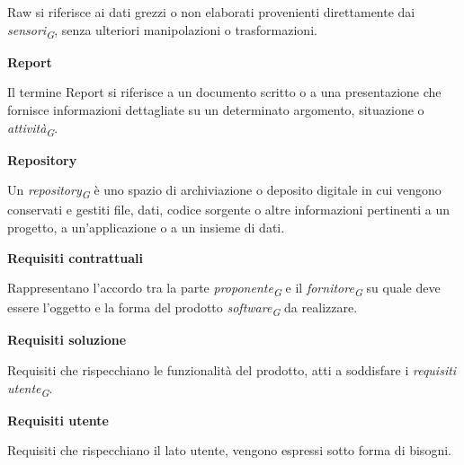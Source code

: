 \documentclass{article}
\begin{document}
\vspace{0.1cm}

Raw si riferisce ai dati grezzi o non elaborati provenienti direttamente dai \textit{sensori}\textsubscript{\textit{G}}, senza ulteriori manipolazioni o trasformazioni.

\vspace{0.4cm}

\textbf{Report}

\vspace{0.1cm}

Il termine Report si riferisce a un documento scritto o a una presentazione che fornisce informazioni dettagliate su un determinato argomento, situazione o \textit{attività}\textsubscript{\textit{G}}.

\vspace{0.4cm}

\textbf{Repository}

\vspace{0.1cm}

Un \textit{repository}\textsubscript{\textit{G}} è uno spazio di archiviazione o deposito digitale in cui vengono conservati e gestiti file, dati, codice sorgente o altre informazioni pertinenti a un progetto, a un'applicazione o a un insieme di dati.

\vspace{0.4cm}

\textbf{Requisiti contrattuali}

\vspace{0.1cm}

Rappresentano l’accordo tra la parte \textit{proponente}\textsubscript{\textit{G}} e il \textit{fornitore}\textsubscript{\textit{G}} su quale deve essere l’oggetto e la forma del prodotto \textit{software}\textsubscript{\textit{G}} da realizzare.

\vspace{0.4cm}

\textbf{Requisiti soluzione}

\vspace{0.1cm}

Requisiti che rispecchiano le funzionalità del prodotto, atti a soddisfare i \textit{requisiti utente}\textsubscript{\textit{G}}.

\vspace{0.4cm}

\textbf{Requisiti utente}

\vspace{0.1cm}

Requisiti che rispecchiano il lato utente, vengono espressi sotto forma di bisogni.
\end{document}
